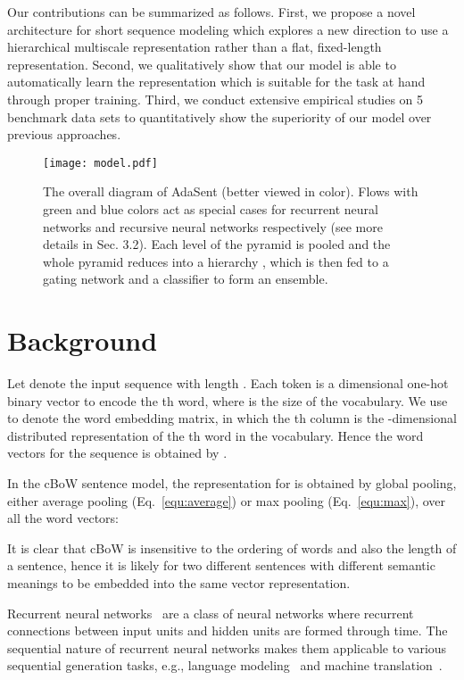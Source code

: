 \documentclass{article}
\theoremstyle{definition}
\begin{document}
Our contributions can be summarized as follows. First, we propose a novel architecture for short sequence modeling which explores a new direction to use a hierarchical multiscale representation rather than a flat, fixed-length representation. Second, we qualitatively show that our model is able to automatically learn the representation which is suitable for the task at hand through proper training. Third, we conduct extensive empirical studies on 5 benchmark data sets to quantitatively show the superiority of our model over previous approaches.

\begin{figure}[htb]
\centering
	\texttt{[image: model.pdf]}
\caption{The overall diagram of AdaSent (better viewed in color).  Flows with green and blue colors act as special cases for recurrent neural networks and recursive neural networks respectively (see more details in Sec. 3.2). Each level of the pyramid is pooled and the whole pyramid reduces into a hierarchy , which is then fed to a gating network and a classifier to form an ensemble.}
\label{fig:model}
\end{figure}

\section{Background}
\label{sec:background}
Let  denote the input sequence with length . Each token  is a  dimensional one-hot binary vector to encode the th word, where  is the size of the vocabulary. We use  to denote the word embedding matrix, in which the th column is the -dimensional distributed representation of the th word in the vocabulary. Hence the word vectors for the sequence  is obtained by .

In the cBoW sentence model, the representation  for  is obtained by global pooling, either average pooling (Eq.~\ref{equ:average}) or max pooling (Eq.~\ref{equ:max}), over all the word vectors:


It is clear that cBoW is insensitive to the ordering of words and also the length of a sentence, hence it is likely for two different sentences with different semantic meanings to be embedded into the same vector representation.

Recurrent neural networks~\cite{elman1990finding} are a class of neural networks where recurrent connections between input units and hidden units are formed through time. The sequential nature of recurrent neural networks makes them applicable to various sequential generation tasks, e.g., language modeling~\cite{mikolov2010recurrent} and machine translation~\cite{bahdanau2014neural,cho2014properties}.
\end{document}
